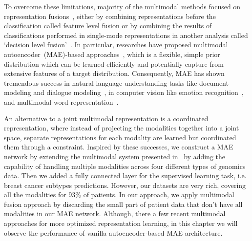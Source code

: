 \hspace*{3.5mm} To overcome these limitations, majority of the multimodal methods focused on representation fusions~\cite{ito2018effects}, either by combining representations before the classification called feature level fusion or by combining the results of classifications performed in single-mode representations in another analysis  called `decision level fusion'~\cite{atrey2010multimodal}. In particular, researches have proposed multimodal autoencoder~(MAE)-based approaches~\cite{liu2016multimodal,serban2016multi,wang2018associativemulti}, which is a flexible, simple prior distribution which can be learned efficiently and potentially capture from extensive features of a target distribution. Consequently, MAE has shown tremendous success in natural language understanding tasks like document modeling and dialogue modeling~\cite{serban2016multi}, in computer vision like emotion recognition~\cite{liu2016multimodal}, and multimodal word representation~\cite{wang2018associativemulti}. 

\hspace*{3.5mm} An alternative to a joint multimodal representation is a coordinated representation, where instead of projecting the modalities together into a joint space, separate representations for each modality are learned but coordinated them through a constraint. Inspired by these successes, we construct a MAE network by extending the multimodal system presented in~\cite{wang2018associativemulti} by adding the capability of handling multiple modalities across four different types of genomics data. Then we added a fully connected layer for the supervised learning task, i.e. breast cancer subtypes predictions. However, our datasets are very rich, covering all the modalities for $93\%$ of patients. In our approach, we apply multimodal fusion approach by discarding the small part of patient data that don't have all modalities in our MAE network. Although, there a few recent multimodal approaches for more optimized representation learning, in this chapter we will observe the performance of vanilla autoencoder-based MAE architecture. 

